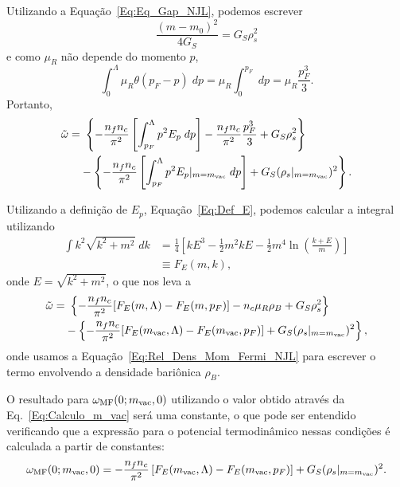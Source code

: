 %
Utilizando a Equação~\eqref{Eq:Eq_Gap_NJL}, podemos escrever
\begin{equation}
	\frac{(m - m_0)^2}{4G_S} = G_S \rho_s^2
\end{equation}
%
e como $\mu_R$ não depende do momento $p$,
\begin{equation}
	\int_0^\Lambda \mu_R \theta(p_F - p) \; dp = \mu_R \int_{0}^{p_F} \; dp = \mu_R\frac{p_F^3}{3}.
\end{equation}
%
Portanto,
\begin{equation}
\begin{split}
\tilde{\omega} =&~ \left\{- \frac{n_f n_c}{\pi^2} \left[\int_{p_F}^\Lambda p^2E_p \; dp \right] - \frac{n_f n_c}{\pi^2} \frac{p_F^3}{3} + G_S\rho_s^2\right\} \\
&-\left\{- \frac{n_f n_c}{\pi^2} \left[\int_{p_F}^\Lambda p^2 E_p|_{m=m_{\rm{vac}}} \; dp \right] + G_S(\rho_s|_{m = m_{\rm{vac}}})^2\right\}.
\end{split}
\end{equation}

Utilizando a definição de $E_p$, Equação~\eqref{Eq:Def_E}, podemos calcular a integral utilizando
\begin{align}
	\int k^2 \sqrt{k^2 + m^2} \;dk &= \frac{1}{4}\left[k E^3 - \frac{1}{2} m^2 k E - \frac{1}{2} m^4\ln\left(\frac{k+E}{m}\right)\right] \\
	&\equiv F_E(m, k),
\end{align}
%
onde $E = \sqrt{k^2 + m^2}$, o que nos leva a
\begin{equation}
\begin{split}
\tilde{\omega} =&~ \left\{- \frac{n_f n_c}{\pi^2} [F_E(m,\Lambda) - F_E(m, p_F)] - n_c\mu_R \rho_B + G_S\rho_s^2\right\} \\
&-\left\{- \frac{n_f n_c}{\pi^2} [F_E(m_{\rm{vac}}, \Lambda) - F_E(m_{\rm{vac}}, p_F)] + G_S(\rho_s|_{m = m_{\rm{vac}}})^2\right\},
\end{split}
\end{equation}
%
onde usamos a Equação~\eqref{Eq:Rel_Dens_Mom_Fermi_NJL} para escrever o termo envolvendo a densidade bariônica $\rho_B$.

O resultado  para $\omega_{\rm{MF}}(0;m_{\rm{vac}},0)$ utilizando o valor obtido através da Eq.~\eqref{Eq:Calculo_m_vac} será uma constante, o que pode ser entendido verificando que a expressão para o potencial termodinâmico nessas condições é calculada a partir de constantes:
\begin{equation}
	\omega_{\rm{MF}}(0;m_{\rm{vac}},0) = -\frac{n_f n_c}{\pi^2}\left[F_E(m_{\rm{vac}}, \Lambda) - F_E(m_{\rm{vac}}, p_F)\right] + G_S(\rho_s|_{m=m_{\rm{vac}}})^2.
\end{equation}

